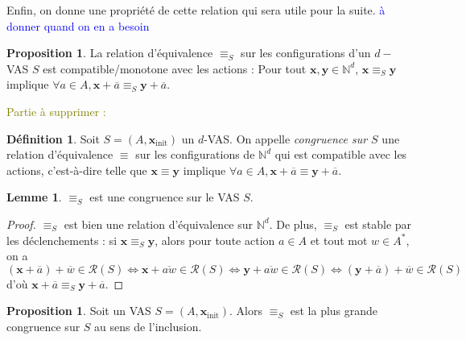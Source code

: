 \documentclass[a4paper,final]{article}
\theoremstyle{definition}
\newtheorem{Definition}[Theorem]{Définition}
\newtheorem{Proposition}[Theorem]{Proposition}
\newtheorem{Lemma}[Theorem]{Lemme}
\newcommand{\alain}[1]{\textcolor{blue}{#1}}
\newcommand{\lucas}[1]{\textcolor{olive}{#1}}
\newcommand{\N}{\ensuremath{\mathbb{N}}}
\newcommand{\conf}{\ensuremath{\mathcal{R}}}
\newcommand{\vect}[1]{\ensuremath{\mathbf{#1}}}
\newcommand{\rel}{\ensuremath{\equiv}}
\newcommand{\equivaut}{\ensuremath{\Leftrightarrow}}
\newcommand{\xinit}{\ensuremath{\vect{x}_\text{init}}}
\newcommand{\valeur}[1]{\ensuremath{\overline{#1}}}
\begin{document}
Enfin, on donne une propriété de cette relation qui sera utile pour la suite. \alain{à donner quand on en a besoin}

\begin{Proposition}
La relation d'équivalence $\rel_S$ sur les configurations d'un $d-$VAS $S$ est compatible/monotone avec les actions :
Pour tout $\vect{x},\vect{y}\in\N^d$, $\vect{x}\rel_S \vect{y}$ implique $\forall a\in A, \vect{x} +\valeur{a} \rel_S \vect{y} +\valeur{a}$.
\end{Proposition}

\lucas{Partie à supprimer :}
\color{red} %

\begin{Definition}
Soit $S=(A,\xinit)$ un $d$-VAS.
On appelle \emph{congruence sur $S$} une relation d'équivalence $\rel$ sur les configurations de $\N^d$ qui est compatible avec les actions, 
c'est-à-dire telle que $\vect{x}\rel \vect{y}$ implique $\forall a\in A, \vect{x} +\valeur{a} \rel \vect{y} +\valeur{a}$.
\end{Definition}



\begin{Lemma}
 $\rel_S$ est une congruence sur le VAS $S$.
\end{Lemma}

\begin{proof}
$\rel_S$ est bien une relation d'équivalence sur $\N^d$.
De plus, $\rel_S$ est stable par les déclenchements : 
si $\vect{x}\rel_S \vect{y}$, alors pour toute action $a\in A$ et tout mot $w\in A^\ast$, 
on a $$(\vect{x} +\valeur{a}) +\valeur{w} \in\conf(S) 
    \equivaut \vect{x} +\valeur{aw} \in\conf(S)
    \equivaut \vect{y} +\valeur{aw} \in\conf(S)
    \equivaut (\vect{y} +\valeur{a}) +\valeur{w} \in\conf(S)$$
d'où $\vect{x}+\valeur{a} \rel_S \vect{y}+\valeur{a}$.
\end{proof}

\begin{Proposition}
Soit un VAS $S=(A,\xinit)$.
Alors $\rel_S$ est la plus grande congruence sur $S$ au sens de l'inclusion.
\end{Proposition}
\end{document}

